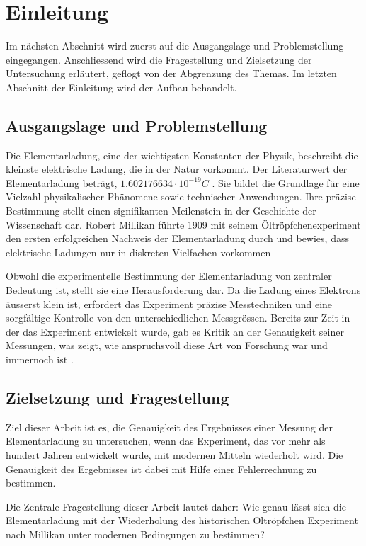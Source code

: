 \chapter{Einleitung}
Im nächsten Abschnitt wird zuerst auf die Ausgangslage und Problemstellung eingegangen. Anschliessend wird die Fragestellung und Zielsetzung der Untersuchung erläutert, geflogt von der Abgrenzung des Themas. Im letzten Abschnitt der Einleitung wird der Aufbau behandelt.

\section{Ausgangslage und Problemstellung}\label{sec:ausgangslage}
Die Elementarladung, eine der wichtigsten Konstanten der Physik, beschreibt die kleinste elektrische Ladung, die in der Natur vorkommt. Der Literaturwert der Elementarladung beträgt, $1.602176634 \cdot 10^{-19} C$ \parencite[123]{fundamentum_mathe}. Sie bildet die Grundlage für eine Vielzahl physikalischer Phänomene sowie technischer Anwendungen. Ihre präzise Bestimmung stellt einen signifikanten Meilenstein in der Geschichte der Wissenschaft dar. Robert Millikan führte 1909 mit seinem Öltröpfchenexperiment den ersten erfolgreichen Nachweis der Elementarladung durch und bewies, dass elektrische Ladungen nur in diskreten Vielfachen vorkommen \parencite{PhysRevSeriesI.32.349}

Obwohl die experimentelle Bestimmung der Elementarladung von zentraler Bedeutung ist, stellt sie eine Herausforderung dar. Da die Ladung eines Elektrons äusserst klein ist, erfordert das Experiment präzise Messtechniken und eine sorgfältige Kontrolle von den unterschiedlichen Messgrössen. Bereits zur Zeit in der das Experiment entwickelt wurde,  gab es Kritik an der Genauigkeit seiner Messungen, was zeigt, wie anspruchsvoll diese Art von Forschung war und immernoch ist \parencite{dewiki:247237013}.

\section{Zielsetzung und Fragestellung}\label{sec:zielsetzung}
Ziel dieser Arbeit ist es, die Genauigkeit des Ergebnisses einer Messung der Elementarladung zu untersuchen, wenn das Experiment, das vor mehr als hundert Jahren entwickelt wurde, mit modernen Mitteln wiederholt wird. Die Genauigkeit des Ergebnisses ist dabei mit Hilfe einer Fehlerrechnung zu bestimmen.

Die Zentrale Fragestellung dieser Arbeit lautet daher: \glqq Wie genau lässt sich die Elementarladung mit der Wiederholung des historischen Öltröpfchen Experiment nach Millikan unter modernen Bedingungen zu bestimmen? \grqq 


